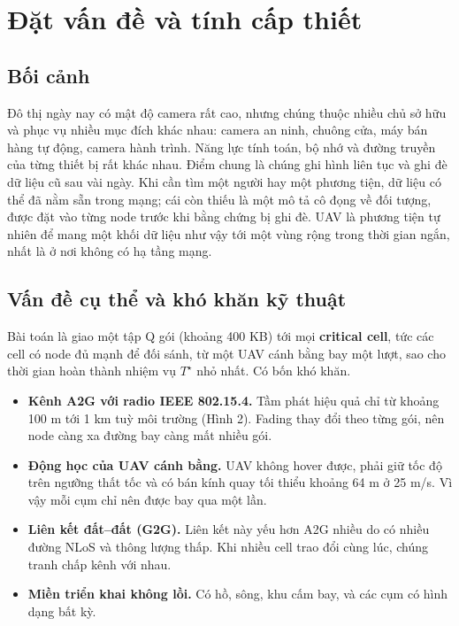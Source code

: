 \section{Đặt vấn đề và tính cấp thiết}

\subsection{Bối cảnh}

Đô thị ngày nay có mật độ camera rất cao, nhưng chúng thuộc nhiều chủ sở
hữu và phục vụ nhiều mục đích khác nhau: camera an ninh, chuông cửa, máy
bán hàng tự động, camera hành trình. Năng lực tính toán, bộ nhớ và đường
truyền của từng thiết bị rất khác nhau. Điểm chung là chúng ghi hình
liên tục và ghi đè dữ liệu cũ sau vài ngày. Khi cần tìm một người hay
một phương tiện, dữ liệu có thể đã nằm sẵn trong mạng; cái còn thiếu là
một mô tả cô đọng về đối tượng, được đặt vào từng node trước khi bằng
chứng bị ghi đè. UAV là phương tiện tự nhiên để mang một khối dữ liệu
như vậy tới một vùng rộng trong thời gian ngắn, nhất là ở nơi không có
hạ tầng mạng.

\subsection{Vấn đề cụ thể và khó khăn kỹ thuật}

Bài toán là giao một tập Q gói (khoảng 400 KB) tới mọi \textbf{critical
cell}, tức các cell có node đủ mạnh để đối sánh, từ một UAV cánh bằng
bay một lượt, sao cho thời gian hoàn thành nhiệm vụ $T^\star$ nhỏ nhất. Có bốn
khó khăn.

\begin{itemize}
\tightlist
\item
  \textbf{Kênh A2G với radio IEEE 802.15.4.} Tầm phát hiệu quả chỉ từ
  khoảng 100 m tới 1 km tuỳ môi trường (Hình 2). Fading thay đổi theo
  từng gói, nên node càng xa đường bay càng mất nhiều gói.
\item
  \textbf{Động học của UAV cánh bằng.} UAV không hover được, phải giữ
  tốc độ trên ngưỡng thất tốc và có bán kính quay tối thiểu khoảng 64 m
  ở 25 m/s. Vì vậy mỗi cụm chỉ nên được bay qua một lần.
\item
  \textbf{Liên kết đất--đất (G2G).} Liên kết này yếu hơn A2G nhiều do có
  nhiều đường NLoS và thông lượng thấp. Khi nhiều cell trao đổi cùng
  lúc, chúng tranh chấp kênh với nhau.
\item
  \textbf{Miền triển khai không lồi.} Có hồ, sông, khu cấm bay, và các
  cụm có hình dạng bất kỳ.
\end{itemize}

